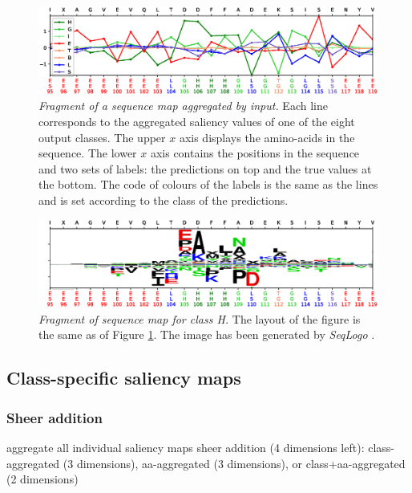 	
	\begin{figure}
	\centering
	\includegraphics[width=1\linewidth]{Figures/sample_8classes}
	\caption{\textit{Fragment of a sequence map aggregated by input.} Each line corresponds to the aggregated saliency values of one of the eight output classes. The upper $x$ axis displays the amino-acids in the sequence. The lower $x$ axis contains the positions in the sequence and two sets of labels: the predictions on top and the true values at the bottom. The code of colours of the labels is the same as the lines and is set according to the class of the predictions.}
	\label{fig:sample_8classes}
	\end{figure}
	
	\begin{figure}
	\centering
	\includegraphics[width=1\linewidth]{Figures/sample_Hclass}
	\caption{\textit{Fragment of sequence map for class H.} The layout of the figure is the same as of Figure \ref{fig:sample_8classes}. The image has been generated by \textit{SeqLogo} \cite{Thomsen2012}.}
	\label{fig:sample_Hclass}
	\end{figure}

	


	\subsection{Class-specific saliency maps}
		\subsubsection{Sheer addition} \label{sect:sheer}
		aggregate all individual saliency maps %
		sheer addition (4 dimensions left): class-aggregated (3 dimensions), aa-aggregated (3 dimensions), or class+aa-aggregated (2 dimensions)
